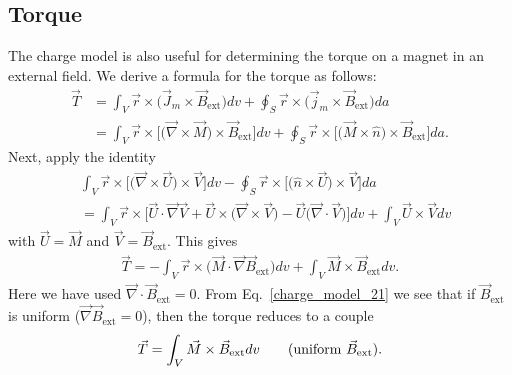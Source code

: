 \documentclass[12pt,a4paper,oneside]{book}
\begin{document}
\begin{onehalfspace}
\subsection{Torque}
The charge model is also useful for determining the torque on a magnet in an external field. We derive a formula for the torque as follows: 
 \begin{equation}\label{charge_model_20}
	{	\begin{aligned}
			\vec{T} &= \int_{V} \vec{r}\times\Big(\vec{J}_m\times\vec{B}_{\text{ext}}\Big)dv+\oint_{S}\vec{r}\times\Big(\vec{j}_m\times\vec{B}_{\text{ext}}\Big)da\\[6pt]
			&=\int_{V}\vec{r}\times\Big[\Big(\vec{\nabla}\times\vec{M}\Big)\times\vec{B}_\text{ext}\Big]dv+\oint_{S}\vec{r}\times\Big[\Big(\vec{M}\times\hat{n}\Big)\times\vec{B}_\text{ext}\Big]da.
	\end{aligned}}
\end{equation}
Next, apply the identity
\begin{equation*}\label{}
\begin{aligned}
	&\int_{V}\vec{r}\times\Big[\Big(\vec{\nabla}\times\vec{U}\Big)\times\vec{V}\Big]dv-\oint_{S}\vec{r}\times\Big[\Big(\hat{n}\times\vec{U}\Big)\times\vec{V}\Big]da \\[6pt]
	&=\int_{V}\vec{r}\times\Big[\vec{U}\cdot\vec{\nabla}\vec{V}+\vec{U}\times\Big(\vec{\nabla}\times\vec{V}\Big)-\vec{U}\Big(\vec{\nabla}\cdot\vec{V}\Big)\Big]dv+\int_{V}\vec{U}\times\vec{V}dv
\end{aligned}
\end{equation*} 
with $\vec{U}=\vec{M}$ and $\vec{V}=\vec{B}_\text{ext}$. This gives
\begin{equation}\label{charge_model_21}
	{\begin{aligned}
			\vec{T} =-\int_{V}\vec{r}\times\Big(\vec{M}\cdot\vec{\nabla}\vec{B}_\text{ext}\Big)dv + \int_{V}\vec{M}\times\vec{B}_\text{ext}dv.
	\end{aligned}}
\end{equation} 
Here we have used $\vec{\nabla}\cdot\vec{B}_\text{ext}=0$. From Eq.~\eqref{charge_model_21} we see that if $\vec{B}_\text{ext}$ is uniform ($\vec{\nabla}\vec{B}_\text{ext}=0$), then the torque reduces to a couple
\begin{equation}\label{charge_model_22}
	{\begin{aligned}
			\vec{T} = \int_{V}\vec{M}\times\vec{B}_\text{ext}dv \qquad\text{(uniform $ \vec{B}_\text{ext}$)}.
	\end{aligned}}
\end{equation} 

\end{onehalfspace}
\end{document}
